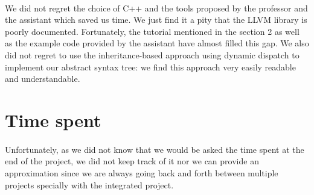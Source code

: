 \documentclass[a4paper, 11pt, oneside]{article}
\begin{document}
\paragraph{}We did not regret the choice of C++ and the tools proposed by the professor and the assistant which saved us time. We just find it a pity that the LLVM library is poorly documented. Fortunately, the tutorial mentioned in the section 2 as well as the example code provided by the assistant have almost filled this gap. We also did not regret to use the inheritance-based approach using dynamic dispatch to implement our abstract syntax tree: we find
this approach very easily readable and understandable.

\section{Time spent}
\paragraph{}Unfortunately, as we did not know that we would be asked the time spent at the end of the project, we did not keep track of it nor we can provide an approximation since we are always going back and forth between multiple projects specially with the integrated project.

 
\end{document}
